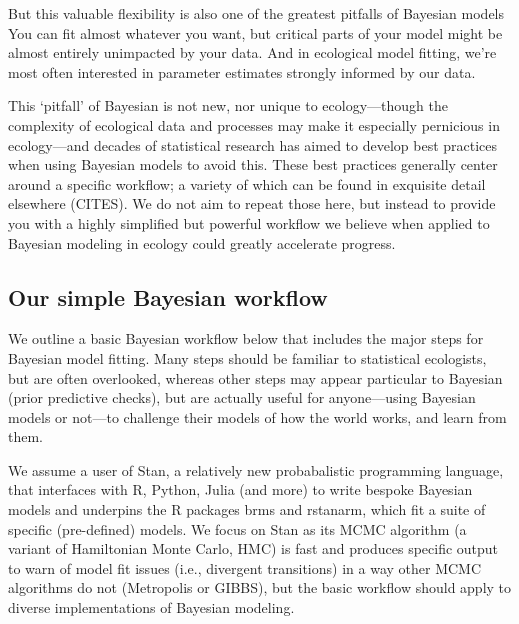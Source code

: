 \documentclass[11pt]{article}
\begin{document}
But this valuable flexibility is also one of the greatest pitfalls of Bayesian models You can fit almost whatever you want, but critical parts of your model might be almost entirely unimpacted by your data. And in ecological model fitting, we're most often interested in parameter estimates strongly informed by our data. 

This `pitfall' of Bayesian is not new, nor unique to ecology---though the complexity of ecological data and processes may make it especially pernicious in ecology---and decades of statistical research has aimed to develop best practices when using Bayesian models to avoid this. These best practices generally center around a specific workflow; a variety of which can be found in exquisite detail elsewhere (CITES). We do not aim to repeat those here, but instead to provide you with a highly simplified but powerful workflow we believe when applied to Bayesian modeling in ecology could greatly accelerate progress. %

\subsection{Our simple Bayesian workflow}

We outline a basic Bayesian workflow below that includes the major steps for Bayesian model fitting. Many steps should be familiar to statistical ecologists, but are often overlooked, whereas other steps may appear particular to Bayesian (\eg prior predictive checks), but are actually useful for anyone---using Bayesian models or not---to challenge their models of how the world works, and learn from them. 

We assume a user of \textsf{Stan}, a relatively new probabalistic programming language, that interfaces with \textsf{R, Python, Julia} (and more) to write bespoke Bayesian models and underpins the \textsf{R} packages \textsf{brms} and \textsf{rstanarm}, which fit a suite of specific (pre-defined) models. We focus on \textsf{Stan} as its MCMC algorithm (a variant of Hamiltonian Monte Carlo, HMC) is fast and produces specific output to warn of model fit issues (i.e., divergent transitions) in a way other MCMC algorithms do not (\eg Metropolis or GIBBS), but the basic workflow should apply to diverse implementations of Bayesian modeling. \\
\end{document}
